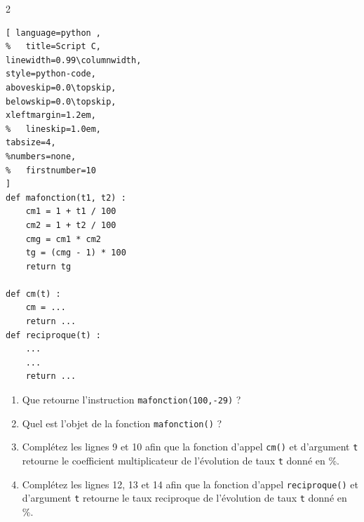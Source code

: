 \documentclass[main.tex]{subfiles}
\begin{document}
\begin{exercise}\hfill 
	
\begin{multicols}{2}
\begin{lstlisting}[ language=python , 
%	title=Script C,   
linewidth=0.99\columnwidth,
style=python-code,    
aboveskip=0.0\topskip,
belowskip=0.0\topskip,
xleftmargin=1.2em,
%	lineskip=1.0em,
tabsize=4, 
%numbers=none,
%	firstnumber=10  
] 
def mafonction(t1, t2) :
	cm1 = 1 + t1 / 100
	cm2 = 1 + t2 / 100
	cmg = cm1 * cm2
	tg = (cmg - 1) * 100
	return tg
	
def cm(t) :
	cm = ...
	return ...
def reciproque(t) :
	...
	...
	return ...
\end{lstlisting}
\end{multicols}
\begin{enumerate}[label=\arabic*), leftmargin=*]
	\item Que retourne l'instruction \lstinline|mafonction(100,-29)| ?
	\item Quel est l'objet de la fonction \lstinline|mafonction()| ?
	\item Complétez les lignes 9 et 10 afin que la fonction d'appel \lstinline|cm()| et d'argument \lstinline|t| retourne le coefficient multiplicateur de l'évolution de taux \lstinline|t| donné en \%.
	\item Complétez les lignes 12, 13 et 14 afin que la fonction d'appel \lstinline|reciproque()| et d'argument \lstinline|t| retourne le taux reciproque de l'évolution de taux \lstinline|t| donné en \%.
\end{enumerate}
\end{exercise} 



%	 
\cleardoublepage 
%	
\end{document}
